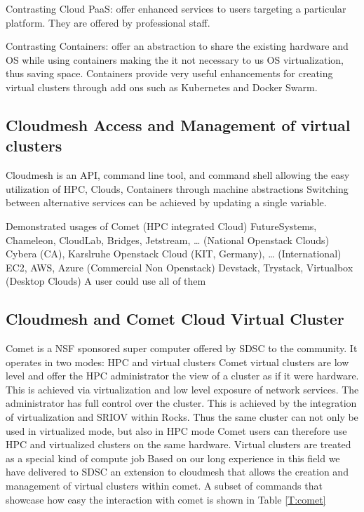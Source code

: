 Contrasting Cloud PaaS: offer enhanced services to users targeting a
particular platform. They are offered by professional staff.

Contrasting Containers: offer an abstraction to share the existing hardware and OS while using containers making the it not necessary to us OS virtualization, thus saving space. Containers provide very useful enhancements for creating virtual clusters through add ons such as Kubernetes and Docker Swarm.



\subsection{Cloudmesh Access and Management of virtual clusters}
Cloudmesh is an API, command line tool, and command shell allowing the easy utilization of HPC, Clouds, Containers through machine abstractions
Switching between alternative services can be achieved by updating a
single variable.

Demonstrated usages of
Comet                                                                                           (HPC integrated Cloud)
FutureSystems, Chameleon, CloudLab, Bridges, Jetstream, …  (National Openstack Clouds)
Cybera (CA), Karslruhe Openstack Cloud (KIT, Germany), …     (International)
EC2, AWS, Azure                                                                          (Commercial Non Openstack)
Devstack, Trystack, Virtualbox                                                       (Desktop Clouds)
A user could use all of them

\subsection{Cloudmesh and Comet Cloud Virtual Cluster}

Comet is a NSF sponsored super computer offered by SDSC to the
community. It operates in two modes: HPC and virtual clusters Comet
virtual clusters are low level and offer the HPC administrator the
view of a cluster as if it were hardware. This is achieved via
virtualization and low level exposure of network services. The
administrator has full control over the cluster.  This is achieved by
the integration of virtualization and SRIOV within Rocks. Thus the
same cluster can not only be used in virtualized mode, but also in HPC
mode Comet users can therefore use HPC and virtualized clusters on the
same hardware. Virtual clusters are treated as a special kind of
compute job Based on our long experience in this field we have
delivered to SDSC an extension to cloudmesh that allows the creation
and management of virtual clusters within comet. A subset of commands
that showcase how easy the interaction with comet is shown in Table \ref{T:comet}

